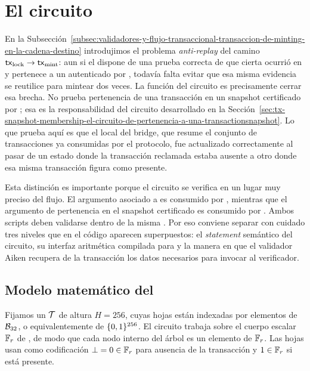 
\section{El circuito \TxSetUpdateCircuit}
\label{sec:tx-set-update-el-circuito-txsetupdatecircuit}

En la Subsección~\ref{subsec:validadores-y-flujo-transaccional-transaccion-de-minting-en-la-cadena-destino} introdujimos el problema \textit{anti-replay} del camino $\mathsf{tx}_{\mathrm{lock}} \rightarrow \mathsf{tx}_{\mathrm{mint}}$: aun si el \zkBridge dispone de una prueba correcta de que cierta \LockTx ocurrió en \Cardano y pertenece a un \TransactionSnapshot autenticado por \Mithril, todavía falta evitar que esa misma evidencia se reutilice para mintear dos veces. La función del circuito \TxSetUpdateCircuit es precisamente cerrar esa brecha. No prueba pertenencia de una transacción en un snapshot certificado por \Mithril; esa es la responsabilidad del circuito desarrollado en la Sección~\ref{sec:tx-snapshot-membership-el-circuito-de-pertenencia-a-una-transactionsnapshot}. Lo que prueba aquí es que el \SMT local del bridge, que resume el conjunto de transacciones ya consumidas por el protocolo, fue actualizado correctamente al pasar de un estado donde la transacción reclamada estaba ausente a otro donde esa misma transacción figura como presente.

Esta distinción es importante porque el circuito se verifica \Onchain en un lugar muy preciso del flujo. El argumento \Groth asociado a \TxSetUpdateCircuit es consumido por \TxsUpdaterMintingValidator, mientras que el argumento de pertenencia en el snapshot certificado es consumido por \MintingValidator. Ambos scripts deben validarse dentro de la misma \MintTx. Por eso conviene separar con cuidado tres niveles que en el código aparecen superpuestos: el \emph{statement} semántico del circuito, su interfaz aritmética compilada para \Groth y la manera en que el validador Aiken recupera de la transacción los datos necesarios para invocar al verificador.

\subsection{Modelo matemático del \SMT}
\label{subsec:tx-set-update-modelo-matematico-del-smt}

Fijamos un \SMT $\mathcal{T}$ de altura $H = 256$, cuyas hojas están indexadas por elementos de $\mathcal{B}_{32}$, o equivalentemente de $\{0,1\}^{256}$. El circuito trabaja sobre el cuerpo escalar $\mathbb{F}_r$ de \BLS, de modo que cada nodo interno del árbol es un elemento de $\mathbb{F}_r$. Las hojas usan como codificación $\bot = 0 \in \mathbb{F}_r$ para ausencia de la transacción y $1 \in \mathbb{F}_r$ si está presente.

